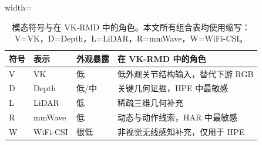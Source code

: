 \begin{table}[H]
\centering
\caption{模态符号与在 VK-RMD 中的角色。本文所有组合表均使用缩写：V=VK，D=Depth，L=LiDAR，R=mmWave，W=WiFi-CSI。}
\label{tab:notation_cn}
\scriptsize
\begin{adjustbox}{width=\linewidth}
\begin{tabular}{llll}
\toprule
符号 & 表示 & 外观暴露 & 在 VK-RMD 中的角色 \\
\midrule
V & VK & 低 & 低外观关节结构输入，替代下游 RGB \\
D & Depth & 低/中 & 关键几何证据，HPE 中最敏感 \\
L & LiDAR & 低 & 稀疏三维几何补充 \\
R & mmWave & 低 & 动态与动作线索，HAR 中最敏感 \\
W & WiFi-CSI & 很低 & 非视觉无线感知补充，仅用于 HPE \\
\bottomrule
\end{tabular}
\end{adjustbox}
\end{table}
